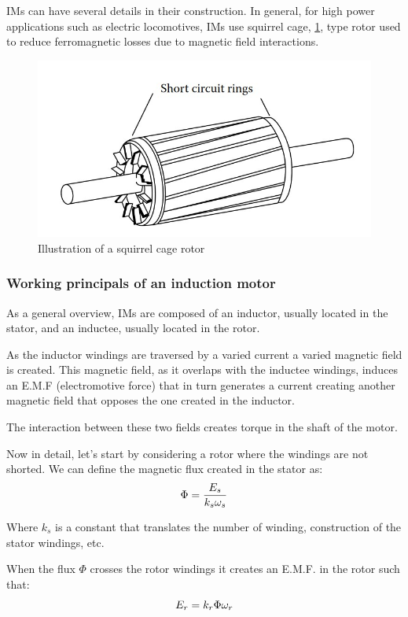 IMs can have several details in their construction. In general, for high power applications such as electric locomotives, IMs use squirrel cage, \ref{fig:SquirrelCage}, type rotor used to reduce ferromagnetic losses due to magnetic field interactions. 
\begin{figure}[ht]
    \centering
    \includegraphics[scale = 0.5]{Figures/RotorSquirrleCageIM.jpg}
    \caption{Illustration of a squirrel cage rotor \cite{BibBase}}
    \label{fig:SquirrelCage}
\end{figure}
\subsubsection{Working principals of an induction motor}
As a general overview, IMs are composed of an inductor, usually located in the stator, and an inductee, usually located in the rotor. 

As the inductor windings are traversed by a varied current a varied magnetic field is created. This magnetic field, as it overlaps with the inductee windings, induces an E.M.F (electromotive force) that in turn generates a current creating another magnetic field that opposes the one created in the inductor. 

The interaction between these two fields creates torque in the shaft of the motor.

Now in detail, let's start by considering a rotor where the windings are not shorted. We can define the magnetic flux created in the stator as:
\begin{equation}\label{StatorFlux}
    \Phi = \frac{E_s}{k_s\*\omega_s}
\end{equation}

Where $k_s$ is a constant that translates the number of winding, construction of the stator windings, etc.

When the flux $\Phi$ crosses the rotor windings it creates an E.M.F. in the rotor such that:
\begin{equation}
    E_r = k_r\*\Phi\*\omega_r
\end{equation}

